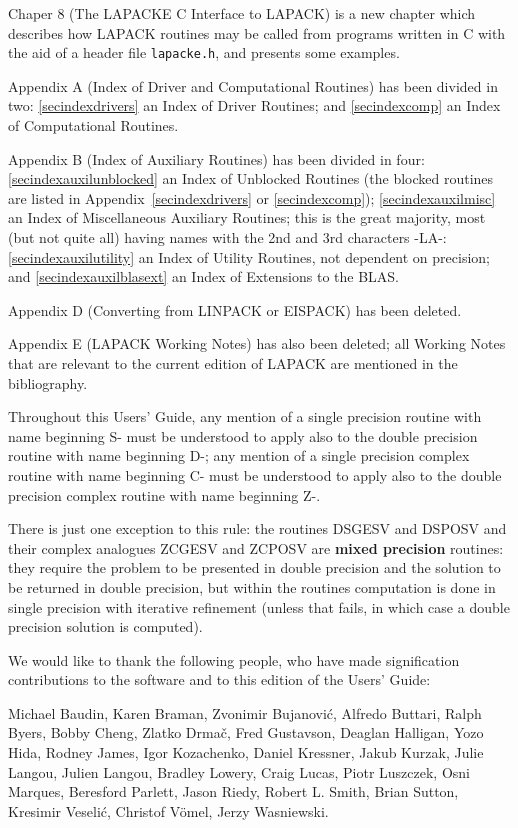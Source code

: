 Chaper 8 (The LAPACKE C Interface to LAPACK) is a new chapter which describes how LAPACK
routines may be called from programs written in C with the aid of a header file {\tt lapacke.h},
and presents some examples.
 
Appendix A (Index of Driver and Computational Routines) has been divided in two:
\ref{secindexdrivers} an Index of Driver Routines;
and \ref{secindexcomp} an Index of Computational Routines.

Appendix B (Index of Auxiliary Routines) has been divided in four:
\ref{secindexauxilunblocked} an Index of Unblocked Routines (the blocked routines are listed in Appendix~\ref{secindexdrivers} or \ref{secindexcomp});
\ref{secindexauxilmisc} an Index of Miscellaneous Auxiliary Routines; this is the great majority,
most (but not quite all)  having names with the 2nd  and 3rd characters -LA-:
\ref{secindexauxilutility} an Index of Utility Routines, not dependent on precision;
and \ref{secindexauxilblasext} an Index of Extensions to the BLAS.

Appendix D (Converting from LINPACK or EISPACK) has been deleted.

Appendix E (LAPACK Working Notes) has also been deleted;
all Working Notes that are relevant to the current edition of LAPACK
are mentioned in the bibliography.

Throughout this Users' Guide, any mention of a single precision routine with name beginning S-
must be understood to apply also to the double precision routine with name beginning D-;
any mention of a single precision complex routine with name beginning C-
must be understood to apply also to the double precision complex routine with name beginning Z-.

There is just one exception to this rule: the routines DSGESV and DSPOSV and
their complex analogues ZCGESV and ZCPOSV are {\bf mixed precision} routines:
they require the problem to be presented in double precision and the solution to be returned in
double precision, but within the routines computation is done in single precision with
iterative refinement (unless that fails, in which case a double precision solution is computed).

We would like to thank the following people, who have made signification contributions to
the software and to this edition of the Users' Guide:

Michael Baudin,
Karen Braman,
Zvonimir Bujanovi\'{c},
Alfredo Buttari,
Ralph Byers,
Bobby Cheng,
Zlatko Drma\v{c},
Fred Gustavson,
Deaglan Halligan,
Yozo Hida,
Rodney James,
Igor Kozachenko,
Daniel Kressner,
Jakub Kurzak,
Julie Langou,
Julien Langou,
Bradley Lowery,
Craig Lucas,
Piotr Luszczek,
Osni Marques,
Beresford Parlett,
Jason Riedy,
Robert L. Smith,
Brian Sutton,
Kresimir Veseli\'{c},
Christof V\"{o}mel,
Jerzy Wasniewski.
  

